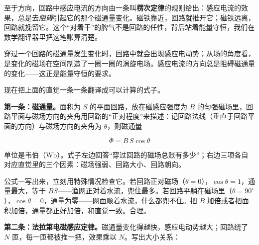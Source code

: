 至于方向，回路中感应电流的方向由一条叫\textbf{楞次定律}的规则给出：感应电流的效果，总是去\emph{阻碍}引起它的那个磁通量变化。磁铁靠近，回路就推开它；磁铁远离，回路就挽留它。这个“对着干”的脾气不是回路的任性，背后站着能量守恒，我们在数学翻译器里把这笔账算清楚。


\begin{oneline}
穿过一个回路的磁通量发生变化时，回路中就会出现感应电动势；从场的角度看，是变化的磁场在空间制造了一圈一圈的涡旋电场。感应电流的方向总是阻碍磁通量的变化——这正是能量守恒的要求。
\end{oneline}


现在把上面的直觉一条一条翻译成可以计算的式子。

\textbf{第一条：磁通量。}面积为 \(S\) 的平面回路，放在磁感应强度为 \(B\) 的匀强磁场里，回路平面与磁场方向的夹角用回路的“正对程度”来描述：记回路法线（垂直于回路平面的方向）与磁场方向的夹角为 \(\theta\)，则磁通量

\[
\Phi = B\,S\cos\theta
\]

单位是韦伯（Wb）。式子左边回答“穿过回路的磁场总账有多少”；右边三项各自对应直觉里的三个因素：磁场强弱、回路大小、回路朝向。

\begin{center}
\end{center}

公式一写出来，立刻用特殊情况检查它。若回路正对磁场（\(\theta=0\)），\(\cos\theta=1\)，通量最大，等于 \(BS\)——渔网正对着水流，兜住最多。若回路平躺在磁场里（\(\theta=90^{\circ}\)），\(\cos\theta=0\)，通量为零——网面顺着水流，什么都兜不住。把 \(B\) 加倍或者把面积加倍，通量都正好加倍，和直觉一致。合理。

\textbf{第二条：法拉第电磁感应定律。}磁通量变化得越快，感应电动势越大；回路绕了 \(N\) 匝，每一匝都被推一把，效果乘以 \(N\)。写出大小关系：

